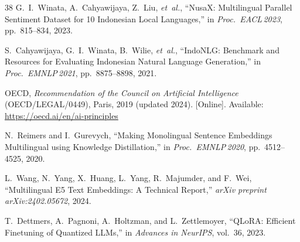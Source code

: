\documentclass[conference]{IEEEtran}
\begin{document}
\begin{thebibliography}{38}
G.~I.~Winata, A.~Cahyawijaya, Z.~Liu, \textit{et~al.}, ``NusaX: Multilingual
Parallel Sentiment Dataset for 10 Indonesian Local Languages,''
in \textit{Proc.\ EACL\,2023}, pp.~815--834, 2023.

S.~Cahyawijaya, G.~I.~Winata, B.~Wilie, \textit{et~al.}, ``IndoNLG: Benchmark
and Resources for Evaluating Indonesian Natural Language Generation,''
in \textit{Proc.\ EMNLP\,2021}, pp.~8875--8898, 2021.

OECD, \textit{Recommendation of the Council on Artificial Intelligence}
(OECD/LEGAL/0449), Paris, 2019 (updated 2024). [Online]. Available:
\url{https://oecd.ai/en/ai-principles}

N.~Reimers and I.~Gurevych, ``Making Monolingual Sentence Embeddings
Multilingual using Knowledge Distillation,'' in \textit{Proc.\ EMNLP\,2020},
pp.~4512--4525, 2020.

L.~Wang, N.~Yang, X.~Huang, L.~Yang, R.~Majumder, and F.~Wei, ``Multilingual
E5 Text Embeddings: A Technical Report,'' \textit{arXiv preprint
arXiv:2402.05672}, 2024.

T.~Dettmers, A.~Pagnoni, A.~Holtzman, and L.~Zettlemoyer, ``QLoRA: Efficient
Finetuning of Quantized LLMs,'' in \textit{Advances in NeurIPS}, vol.~36, 2023.

\end{thebibliography}
\end{document}
